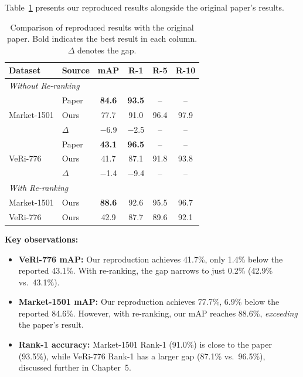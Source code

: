 Table~\ref{tab:main_results} presents our reproduced results alongside the original paper's results.

\begin{table}[H]
    \centering
    \caption{Comparison of reproduced results with the original paper. Bold indicates the best result in each column. $\Delta$ denotes the gap.}
    \label{tab:main_results}
    \begin{tabular}{l l c c c c}
        \toprule
        \textbf{Dataset} & \textbf{Source} & \textbf{mAP} & \textbf{R-1} & \textbf{R-5} & \textbf{R-10} \\
        \midrule
        \multicolumn{6}{l}{\textit{Without Re-ranking}} \\
        \midrule
        \multirow{3}{*}{Market-1501}
            & Paper \cite{tao2024unsupervised} & \textbf{84.6} & \textbf{93.5} & -- & -- \\
            & Ours                              & 77.7 & 91.0 & 96.4 & 97.9 \\
            & $\Delta$                          & $-$6.9 & $-$2.5 & -- & -- \\
        \midrule
        \multirow{3}{*}{VeRi-776}
            & Paper \cite{tao2024unsupervised} & \textbf{43.1} & \textbf{96.5} & -- & -- \\
            & Ours                              & 41.7 & 87.1 & 91.8 & 93.8 \\
            & $\Delta$                          & $-$1.4 & $-$9.4 & -- & -- \\
        \midrule
        \multicolumn{6}{l}{\textit{With Re-ranking \cite{zhong2017reranking}}} \\
        \midrule
        Market-1501 & Ours & \textbf{88.6} & 92.6 & 95.5 & 96.7 \\
        VeRi-776    & Ours & 42.9 & 87.7 & 89.6 & 92.1 \\
        \bottomrule
    \end{tabular}
\end{table}

\textbf{Key observations:}
\begin{itemize}
    \item \textbf{VeRi-776 mAP:} Our reproduction achieves 41.7\%, only 1.4\% below the reported 43.1\%. With re-ranking, the gap narrows to just 0.2\% (42.9\% vs.\ 43.1\%).
    \item \textbf{Market-1501 mAP:} Our reproduction achieves 77.7\%, 6.9\% below the reported 84.6\%. However, with re-ranking, our mAP reaches 88.6\%, \textit{exceeding} the paper's result.
    \item \textbf{Rank-1 accuracy:} Market-1501 Rank-1 (91.0\%) is close to the paper (93.5\%), while VeRi-776 Rank-1 has a larger gap (87.1\% vs.\ 96.5\%), discussed further in Chapter~5.
\end{itemize}

